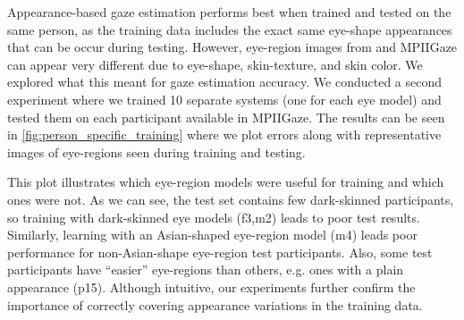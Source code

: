 Appearance-based gaze estimation performs best when trained and tested on the same person, as the training data includes the exact same eye-shape appearances that can be occur during testing.
However, eye-region images from \dataset and MPIIGaze can appear very different due to eye-shape, skin-texture, and skin color.
We explored what this meant for gaze estimation accuracy.
We conducted a second experiment where we trained 10 separate systems (one for each \dataset eye model) and tested them on each participant available in MPIIGaze.
The results can be seen in \autoref{fig:person_specific_training} where we plot errors along with representative images of eye-regions seen during training and testing.

This plot illustrates which \dataset eye-region models were useful for training and which ones were not.
As we can see, the test set contains few dark-skinned participants, so training with dark-skinned eye models (f3,m2) leads to poor test results.
Similarly, learning with an Asian-shaped eye-region model (m4) leads poor performance for non-Asian-shape eye-region test participants.
Also, some test participants have ``easier'' eye-regions than others, e.g. ones with a plain appearance (p15).
Although intuitive, our experiments further confirm the importance of correctly covering appearance variations in the training data.





